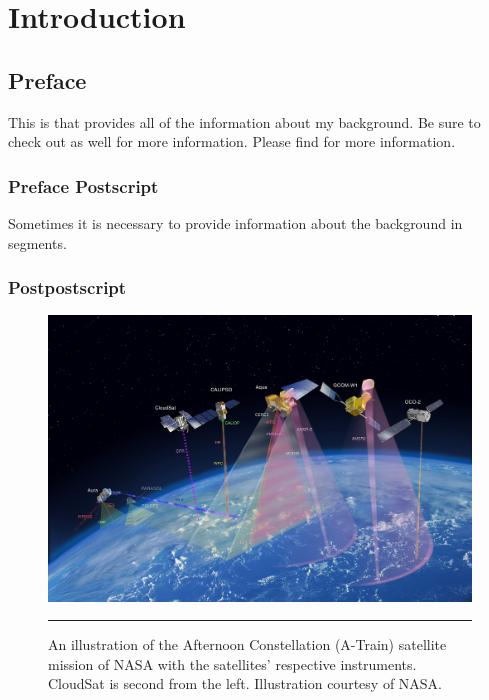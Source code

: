 
\chapter{Introduction} %

\label{Chapter1} %



\section{Preface}\label{section:preface}
This is  that provides all of the information about my background. Be sure to check out  as well for more information. Please find  for more information.

\subsection{Preface Postscript}\label{subsection:postscript}
Sometimes it is necessary to provide information about the background in segments.

\subsection{Postpostscript}

\begin{figure}[h]
\centering
	\includegraphics[width=0.6\linewidth]{Figures/atrain.jpeg}
	\rule{35em}{0.5pt}
	\caption[Afternoon Constellation illustration]{An illustration of the Afternoon Constellation (A-Train) satellite mission of NASA with the satellites' respective instruments. CloudSat is second from the left. Illustration courtesy of NASA.}\label{atrain}
\end{figure}

